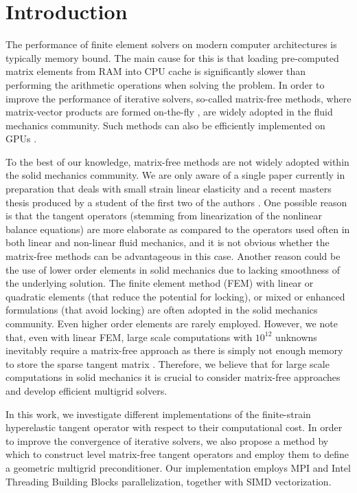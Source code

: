 \documentclass[preprint,12pt,times]{elsarticle}
\begin{document}
\section{Introduction}

The performance of finite element solvers on modern computer architectures is typically memory bound.
The main cause for this is that loading pre-computed matrix elements from RAM into CPU cache is significantly slower than performing the arithmetic operations when solving the problem.
In order to improve the performance of iterative solvers, so-called matrix-free methods,
where matrix-vector products are formed on-the-fly \cite{kronbichler12,May2015, Krank2017, Brown2010, Gmeiner2016},
are widely adopted in the fluid mechanics community.
Such methods can also be efficiently implemented on GPUs \cite{Abdelfattah2016, ljungkvist2017multigrid}.

To the best of our knowledge, matrix-free methods are not widely adopted within the solid mechanics community.
We are only aware of a single paper currently in preparation that deals with small strain linear elasticity \cite{Clevenger2018} and a recent masters thesis produced by a student of the first two of the authors \cite{Mentler2017}.
One possible reason is that the tangent operators (stemming from linearization of the nonlinear balance equations) are
more elaborate as compared to the operators used often in both linear and non-linear fluid mechanics, and it is not obvious whether the matrix-free methods can be advantageous in this case.
Another reason could be the use of lower order elements in solid mechanics due to lacking smoothness of the underlying solution.
The finite element method (FEM) with linear or quadratic elements (that reduce the potential for locking), or mixed or enhanced formulations (that avoid locking) are often adopted in the solid mechanics community.
Even higher order elements are rarely employed.
However, we note that, even with linear FEM, large scale computations with $10^{12}$ unknowns inevitably require a matrix-free approach as there is simply not enough memory to store the sparse tangent matrix \cite{Gmeiner2016}. Therefore, we believe that for large scale computations in solid mechanics it is crucial to consider matrix-free approaches and develop efficient multigrid solvers.

In this work, we investigate different implementations of the finite-strain hyperelastic tangent operator with respect to their computational cost.
In order to improve the convergence of iterative solvers, we also propose a method by which to construct level matrix-free tangent operators
and employ them to define a \mbox{geometric} multigrid preconditioner.
Our implementation employs MPI and Intel Threading Building Blocks parallelization, together with SIMD vectorization.
\end{document}
